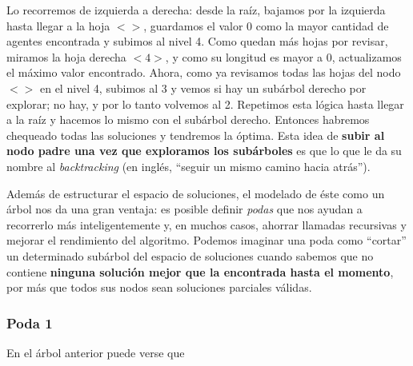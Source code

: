 \documentclass[10pt, a4paper]{article}
\begin{document}
		Lo recorremos de izquierda a derecha: desde la ra\'iz, bajamos por la izquierda hasta llegar a la hoja $<>$, guardamos el valor 0 como la mayor cantidad de agentes encontrada y subimos al nivel 4. Como quedan m\'as hojas por revisar, miramos la hoja derecha $<4>$, y como su longitud es mayor a 0, actualizamos el m\'aximo valor encontrado. Ahora, como ya revisamos todas las hojas del nodo $<>$ en el nivel 4, subimos al 3 y vemos si hay un sub\'arbol derecho por explorar; no hay, y por lo tanto volvemos al 2. Repetimos esta l\'ogica hasta llegar a la ra\'iz y hacemos lo mismo con el sub\'arbol derecho. Entonces habremos chequeado todas las soluciones y tendremos la \'optima. Esta idea de \textbf{subir al nodo padre una vez que exploramos los sub\'arboles} es que lo que le da su nombre al \textit{backtracking} (en ingl\'es, ``seguir un mismo camino hacia atr\'as'').
		
		
		
		Adem\'as de estructurar el espacio de soluciones, el modelado de \'este como un \'arbol nos da una gran ventaja: es posible definir \textit{podas} que nos ayudan a recorrerlo m\'as inteligentemente y, en muchos casos, ahorrar llamadas recursivas y mejorar el rendimiento del algoritmo. Podemos imaginar una poda como ``cortar'' un determinado sub\'arbol del espacio de soluciones cuando sabemos que no contiene \textbf{ninguna soluci\'on mejor que la encontrada hasta el momento}, por m\'as que todos sus nodos sean soluciones parciales v\'alidas.
	
	\subsubsection{Poda 1}
	
	En el \'arbol anterior puede verse que
	
\end{document}
